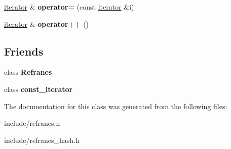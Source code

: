 \begin{DoxyCompactItemize}
\item 
\hyperlink{class_refranes_1_1iterator}{iterator} \& {\bfseries operator=} (const \hyperlink{class_refranes_1_1iterator}{iterator} \&i)\hypertarget{class_refranes_1_1iterator_a98eaa83432fccf55756cd0bae91b8762}{}\label{class_refranes_1_1iterator_a98eaa83432fccf55756cd0bae91b8762}

\item 
\hyperlink{class_refranes_1_1iterator}{iterator} \& {\bfseries operator++} ()\hypertarget{class_refranes_1_1iterator_a85435f7275a2f1ee731385fa835d68c7}{}\label{class_refranes_1_1iterator_a85435f7275a2f1ee731385fa835d68c7}

\end{DoxyCompactItemize}
\subsection*{Friends}
\begin{DoxyCompactItemize}
\item 
class {\bfseries Refranes}\hypertarget{class_refranes_1_1iterator_a7f6877138e51aa5e978647e086657f75}{}\label{class_refranes_1_1iterator_a7f6877138e51aa5e978647e086657f75}

\item 
class {\bfseries const\+\_\+iterator}\hypertarget{class_refranes_1_1iterator_a4d34973bdb3f89801a0bdb2bc553b9d8}{}\label{class_refranes_1_1iterator_a4d34973bdb3f89801a0bdb2bc553b9d8}

\end{DoxyCompactItemize}


The documentation for this class was generated from the following files\+:\begin{DoxyCompactItemize}
\item 
include/refranes.\+h\item 
include/refranes\+\_\+hash.\+h\end{DoxyCompactItemize}
